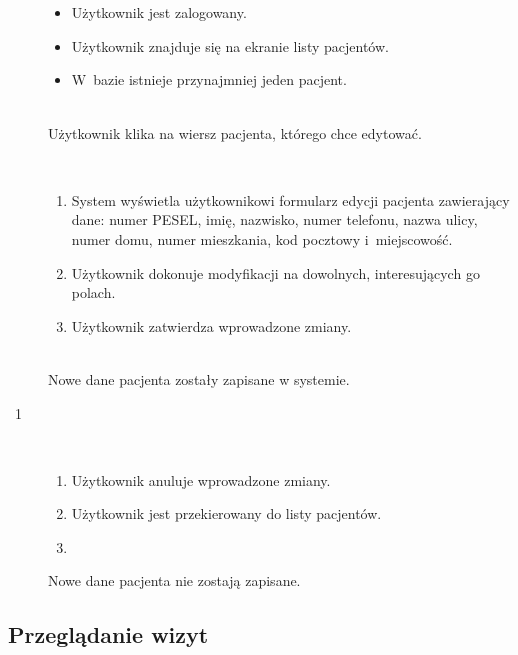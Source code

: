 \documentclass[11pt]{aghdpl}
\begin{document}
	\begin{description}
		\item[\useCaseAktor] \hfill \\
			\useCaseUzytkownik
		\item[\useCaseWarPocz] \hfill \\
			\begin{itemize}
				\item Użytkownik jest zalogowany.
				\item Użytkownik znajduje się na ekranie listy pacjentów.
				\item W~bazie istnieje przynajmniej jeden pacjent.
			\end{itemize}
		\item[\useCaseZdarzInicj] \hfill \\
			Użytkownik klika na wiersz pacjenta, którego chce edytować.
		\item[\useCaseScenBaz] \hfill \\ 
			\begin{enumerate}
				\item System wyświetla użytkownikowi formularz edycji pacjenta zawierający dane: numer PESEL, imię, nazwisko, numer telefonu, nazwa ulicy, numer domu, numer mieszkania, kod pocztowy i~miejscowość.
				\item Użytkownik dokonuje modyfikacji na dowolnych, interesujących go polach.
				\item Użytkownik zatwierdza wprowadzone zmiany.
			\end{enumerate}
		\item[\useCaseWarKonc] \hfill \\ 
			Nowe dane pacjenta zostały zapisane w systemie.
		\item[\useCaseWyjatek~1] \hfill \\
			\begin{enumerate}[label=3a\arabic*.]
				\item Użytkownik anuluje wprowadzone zmiany.
				\item Użytkownik jest przekierowany do listy pacjentów.
				\item \useCaseEnd
			\end{enumerate}
			Nowe dane pacjenta nie zostają zapisane.
	\end{description}

\subsection{Przeglądanie wizyt}
	
\end{document}
